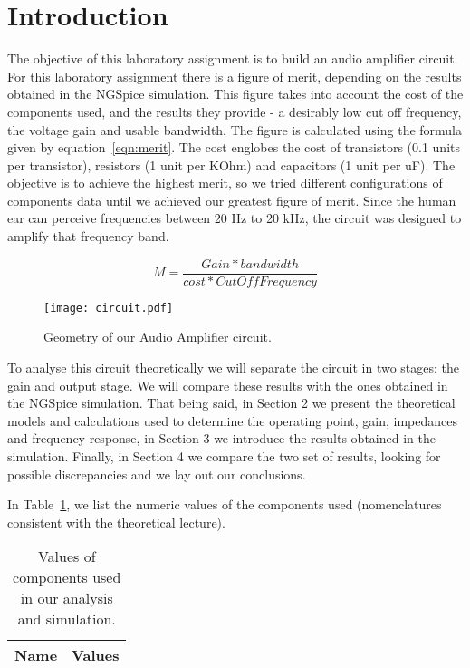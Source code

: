 \section{Introduction}
\label{sec:introduction}
The objective of this laboratory assignment is to build an audio amplifier circuit. 
For this laboratory assignment there is a figure of merit, depending on the results obtained in the NGSpice simulation. This figure takes into account the cost of the components used, and the results they provide - a desirably low cut off frequency, the voltage gain and usable bandwidth. The figure is calculated using the formula given by equation~\ref{eqn:merit}. The cost englobes the cost of transistors (0.1 units per transistor), resistors (1 unit per KOhm) and capacitors (1 unit per uF). The objective is to achieve the highest merit, so we tried different configurations of components data until we achieved our greatest figure of merit.
Since the human ear can perceive frequencies between 20 Hz to 20 kHz, the circuit was designed to amplify that frequency band.

\begin{equation}
\label{eqn:merit}
M=\frac{Gain*bandwidth}{cost*CutOffFrequency}
\end{equation}

\begin{figure}[h] \centering
\texttt{[image: circuit.pdf]}
\caption{Geometry of our Audio Amplifier circuit.}
\end{figure}

To analyse this circuit theoretically we will separate the circuit in two stages: the gain and output stage. We will compare these results with the ones obtained in the NGSpice simulation.
That being said, in Section 2 we present the theoretical models and calculations used to determine the operating point, gain, impedances and frequency response, in Section 3 we introduce the results obtained in the simulation. Finally, in Section 4 we compare the two set of results, looking for possible discrepancies and we lay out our conclusions.

In Table~\ref{tab:data}, we list the numeric values of the components used (nomenclatures consistent with the theoretical lecture).

\begin{table}[h]
  \centering
  \begin{tabular}{|l|r|}
    \hline    
    {\bf Name} & {\bf Values} \\ \hline
     
  \end{tabular}
  \caption{Values of components used in our analysis and simulation.}
  \label{tab:data}
\end{table}
\pagebreak
